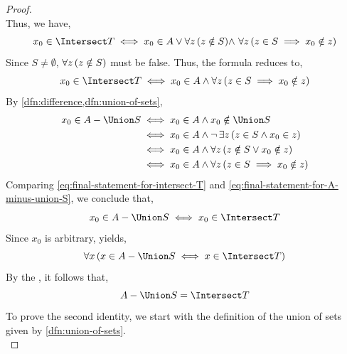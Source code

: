 \begin{proof}
\begin{equation*}
    \end{equation*}
    Thus, we have,
    \begin{equation*}
        x_{0} \in \Intersect T
        \iff
        x_{0} \in A \lor  \forall z \, \mleft( z \notin S \mright) {\land}\,\,  \forall z \, \mleft( z \in S \implies x_{0} \notin z \mright)
    \end{equation*}
    Since \( S \neq \emptyset \), \( \forall z \, \mleft( z \notin S \mright) \) must be false. Thus, the formula reduces to,
    \begin{equation}
        \label{eq:final-statement-for-intersect-T}
        x_{0} \in \Intersect T
        \iff
        x_{0} \in A \land
        \forall z \, \mleft( z \in S \implies x_{0} \notin z \mright)
    \end{equation}
    By \cref{dfn:difference,dfn:union-of-sets},
    \begin{align}
        \label{eq:final-statement-for-A-minus-union-S}
        x_{0} \in A - \Union S
        &\iff
        x_{0} \in A \land x_{0} \notin \Union S \notag \\
        &\iff
        x_{0} \in A \land \lnot \, \exists z \, \mleft( z \in S \land x_{0} \in z \mright) \notag \\
        &\iff
        x_{0} \in A \land \forall z \, \mleft( z \notin S \lor x_{0} \notin z \mright)\notag \\
        &\iff
        x_{0} \in A \land \forall z \, \mleft( z \in S \implies x_{0} \notin z \mright)
    \end{align}
    Comparing \eqref{eq:final-statement-for-intersect-T} and \eqref{eq:final-statement-for-A-minus-union-S}, we conclude that,
    \begin{equation*}
        x_{0} \in A - \Union S \iff x_{0} \in \Intersect T
    \end{equation*}
    Since \( x_{0} \) is arbitrary,  yields,
    \begin{equation*}
        \forall x \, \mleft( x \in A - \Union S \iff x \in \Intersect T \mright)
    \end{equation*}
    By the , it follows that,
    \begin{equation*}
        A - \Union S = \Intersect T
    \end{equation*}
    To prove the second identity, we start with the definition of the union of sets
    given by \cref{dfn:union-of-sets}.
    \begin{equation}

\end{equation}
\end{proof}
